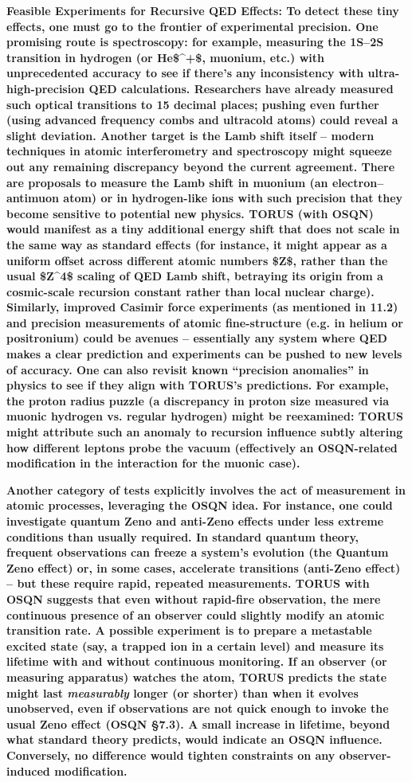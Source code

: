 \documentclass[]{article}
\begin{document}
\textbf{Feasible Experiments for Recursive QED Effects: To detect these
tiny effects, one must go to the frontier of experimental precision. One
promising route is spectroscopy: for example, measuring the 1S--2S
transition in hydrogen (or He\$\^{}+\$, muonium, etc.) with
unprecedented accuracy to see if there's any inconsistency with
ultra-high-precision QED calculations. Researchers have already measured
such optical transitions to 15 decimal places; pushing even further
(using advanced frequency combs and ultracold atoms) could reveal a
slight deviation. Another target is the Lamb shift itself -- modern
techniques in atomic interferometry and spectroscopy might squeeze out
any remaining discrepancy beyond the current agreement. There are
proposals to measure the Lamb shift in muonium (an electron--antimuon
atom) or in hydrogen-like ions with such precision that they become
sensitive to potential new physics. TORUS (with OSQN) would manifest as
a tiny additional energy shift that does not scale in the same way as
standard effects (for instance, it might appear as a uniform offset
across different atomic numbers \$Z\$, rather than the usual \$Z\^{}4\$
scaling of QED Lamb shift, betraying its origin from a cosmic-scale
recursion constant rather than local nuclear charge). Similarly,
improved Casimir force experiments (as mentioned in 11.2) and precision
measurements of atomic fine-structure (e.g. in helium or positronium)
could be avenues -- essentially any system where QED makes a clear
prediction and experiments can be pushed to new levels of accuracy. One
can also revisit known ``precision anomalies'' in physics to see if they
align with TORUS's predictions. For example, the proton radius puzzle (a
discrepancy in proton size measured via muonic hydrogen vs. regular
hydrogen) might be reexamined: TORUS might attribute such an anomaly to
recursion influence subtly altering how different leptons probe the
vacuum (effectively an OSQN-related modification in the interaction for
the muonic case).}

\textbf{Another category of tests explicitly involves the act of
measurement in atomic processes, leveraging the OSQN idea. For instance,
one could investigate quantum Zeno and anti-Zeno effects under less
extreme conditions than usually required. In standard quantum theory,
frequent observations can freeze a system's evolution (the Quantum Zeno
effect) or, in some cases, accelerate transitions (anti-Zeno effect) --
but these require rapid, repeated measurements. TORUS with OSQN suggests
that even without rapid-fire observation, the mere continuous presence
of an observer could slightly modify an atomic transition rate. A
possible experiment is to prepare a metastable excited state (say, a
trapped ion in a certain level) and measure its lifetime with and
without continuous monitoring. If an observer (or measuring apparatus)
watches the atom, TORUS predicts the state might last \emph{measurably}
longer (or shorter) than when it evolves unobserved, even if
observations are not quick enough to invoke the usual Zeno effect (OSQN
§7.3). A small increase in lifetime, beyond what standard theory
predicts, would indicate an OSQN influence. Conversely, no difference
would tighten constraints on any observer-induced modification.}
\end{document}
